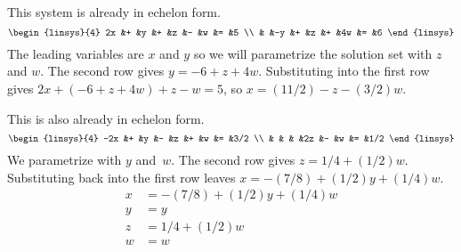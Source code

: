 \documentclass[10pt,t,serif]{beamer} %
\begin{document}
\begin{frame}
\ex
This system is already in echelon form.
\begin{equation*}
  \begin{linsys}{4}
    2x  &+   &y     &+  &z   &-   &w  &= &5  \\
        &   &-y   &+   &z   &+   &4w &= &6 
  \end{linsys} 
\end{equation*}
The leading variables are $x$ and $y$ so we will 
parametrize the solution set with $z$ and $w$.
\pause
The second row gives $y=-6+z+4w$.
Substituting into the first row gives
$2x+(-6+z+4w)+z-w=5$,
so $x=(11/2)-z-(3/2)w$.

\pause
\ex
This is also already in echelon form.
\begin{equation*}
  \begin{linsys}{4}
   -2x  &+  &y  &-  &z   &+   &w  &= &3/2  \\
        &   &   &   &2z  &-   &w  &= &1/2 
  \end{linsys} 
\end{equation*}
We parametrize with $y$ and~$w$.
The second row gives $z=1/4+(1/2)w$.
Substituting back into the first row leaves
$x=-(7/8)+(1/2)y+(1/4)w$.
\pause
\begin{align*}
  x &= -(7/8)+(1/2)y+(1/4)w  \\
  y &= y   \\
  z &= 1/4+(1/2)w   \\
  w &= w
\end{align*}
\end{frame}
\end{document}
